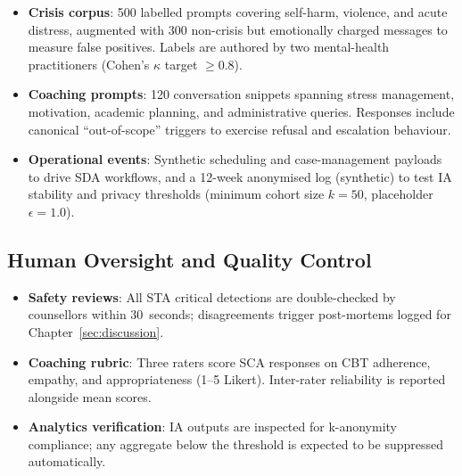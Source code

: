 \begin{itemize}
    \item \textbf{Crisis corpus}: 500 labelled prompts covering self-harm, violence, and acute distress, augmented with 300 non-crisis but emotionally charged messages to measure false positives. Labels are authored by two mental-health practitioners (Cohen's $\kappa$ target $\geq 0.8$).
    \item \textbf{Coaching prompts}: 120 conversation snippets spanning stress management, motivation, academic planning, and administrative queries. Responses include canonical “out-of-scope” triggers to exercise refusal and escalation behaviour.
    \item \textbf{Operational events}: Synthetic scheduling and case-management payloads to drive SDA workflows, and a 12-week anonymised log (synthetic) to test IA stability and privacy thresholds (minimum cohort size $k=50$, placeholder $\epsilon=1.0$).
\end{itemize}

\subsection*{Human Oversight and Quality Control}

\begin{itemize}
    \item \textbf{Safety reviews}: All STA critical detections are double-checked by counsellors within 30~seconds; disagreements trigger post-mortems logged for Chapter~\ref{sec:discussion}.
    \item \textbf{Coaching rubric}: Three raters score SCA responses on CBT adherence, empathy, and appropriateness (1--5 Likert). Inter-rater reliability is reported alongside mean scores.
    \item \textbf{Analytics verification}: IA outputs are inspected for k-anonymity compliance; any aggregate below the threshold is expected to be suppressed automatically.
\end{itemize}


